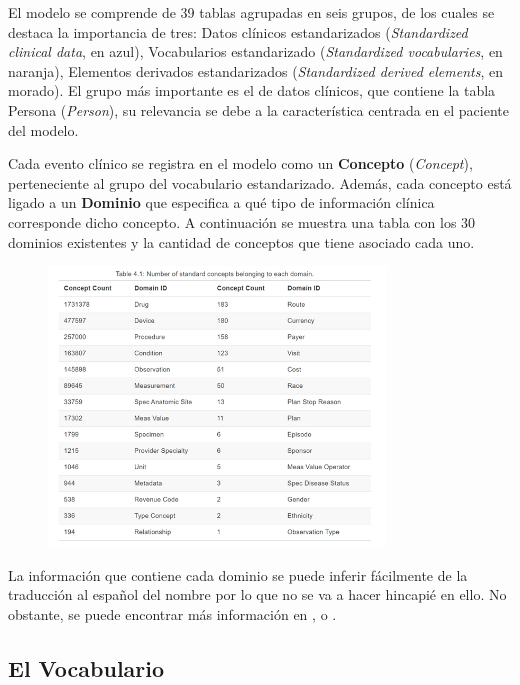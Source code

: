 El modelo se comprende de 39 tablas agrupadas en seis grupos, de los cuales se destaca la importancia de tres: Datos clínicos estandarizados (\textit{Standardized clinical data}, en azul), Vocabularios estandarizado (\textit{Standardized vocabularies}, en naranja), Elementos derivados estandarizados (\textit{Standardized derived elements}, en morado). El grupo más importante es el de datos clínicos, que contiene la tabla Persona (\textit{Person}), su relevancia se debe a la característica centrada en el paciente del modelo.

Cada evento clínico se registra en el modelo como un \textbf{Concepto} (\textit{Concept}), perteneciente al grupo del vocabulario estandarizado. Además, cada concepto está ligado a un \textbf{Dominio} que especifica a qué tipo de información clínica corresponde dicho concepto. A continuación se muestra una tabla con los 30 dominios existentes y la cantidad de conceptos que tiene asociado cada uno.

\begin{figure}[H]
    \centering
    \includegraphics[width=0.80\textwidth]{figures/cdm_domains.png}
    \label{fig:cdm_domains}
\end{figure}

La información que contiene cada dominio se puede inferir fácilmente de la traducción al español del nombre por lo que no se va a hacer hincapié en ello. No obstante, se puede encontrar más información en \cite{OHDSIbook}, \cite{gitPagesCMD} o \cite{CDMinteractive}.

\subsection{El Vocabulario}\label{subsec:05vocab}

